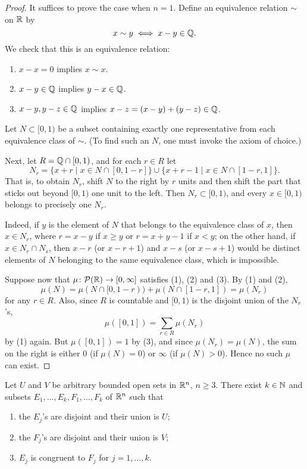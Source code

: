 \begin{proof}
It suffices to prove the case when $n=1$. Define an equivalence relation $\sim$ on $\mathbb R$ by
\[x\sim y\iff x-y\in\mathbb Q.\]
We check that this is an equivalence relation:
\begin{enumerate}[label=(\roman*)]
\item $x-x=0$ implies $x\sim x$.
\item $x-y\in\mathbb Q$ implies $y-x\in\mathbb Q$.
\item $x-y,y-z\in\mathbb Q$ implies $x-z=(x-y)+(y-z)\in\mathbb Q$.
\end{enumerate}

Let $N\subset[0,1)$ be a subset containing exactly one representative from each equivalence class of $\sim$. (To find such an $N$, one must invoke the axiom of choice.)

Next, let $R=\mathbb Q\cap[0,1)$, and for each $r\in R$ let
\[N_r=\{x+r\mid x\in N\cap[0,1-r]\}\cup\{x+r-1\mid x\in N\cap[1-r,1]\}.\]
That is, to obtain $N_r$, shift $N$ to the right by $r$ units and then shift the part that sticks out beyond $[0,1)$ one unit to the left.
Then $N_r\subset[0,1)$, and every $x\in[0,1)$ belongs to precisely one $N_r$.

Indeed, if $y$ is the element of $N$ that belongs to the equivalence class of $x$, then $x\in N_r$, where $r=x-y$ if $x\ge y$ or $r=x+y-1$ if $x<y$; on the other hand, if $x\in N_r\cap N_s$, then $x-r$ (or $x-r+1$) and $x-s$ (or $x-s+1$) would be distinct elements of $N$ belonging to the same equivalence class, which is impossible.

Suppose now that $\mu\colon\mathcal{P}(\mathbb R)\to[0,\infty]$ satisfies (1), (2) and (3). By (1) and (2),
\[\mu(N)=\mu(N\cap[0,1-r))+\mu(N\cap[1-r,1])=\mu(N_r)\]
for any $r\in R$. Also, since $R$ is countable and $[0,1)$ is the disjoint union of the $N_r$'s,
\[\mu([0,1])=\sum_{r\in R}\mu(N_r)\]
by (1) again. But $\mu([0,1])=1$ by (3), and since $\mu(N_r)=\mu(N)$, the sum on the right is either $0$ (if $\mu(N)=0$) or $\infty$ (if $\mu(N)>0$). Hence no such $\mu$ can exist.
\end{proof}

\begin{theorem}
Let $U$ and $V$ be arbitrary bounded open sets in $\mathbb R^n$, $n\ge 3$. There exist $k\in\mathbb N$ and subsets $E_1,\dots,E_k,F_1,\dots,F_k$ of $\mathbb R^n$ such that
\begin{enumerate}
\item the $E_j$'s are disjoint and their union is $U$;
\item the $F_j$'s are disjoint and their union is $V$;
\item $E_j$ is congruent to $F_j$ for $j=1,\dots,k$.
\end{enumerate}
\end{theorem}
\pagebreak

